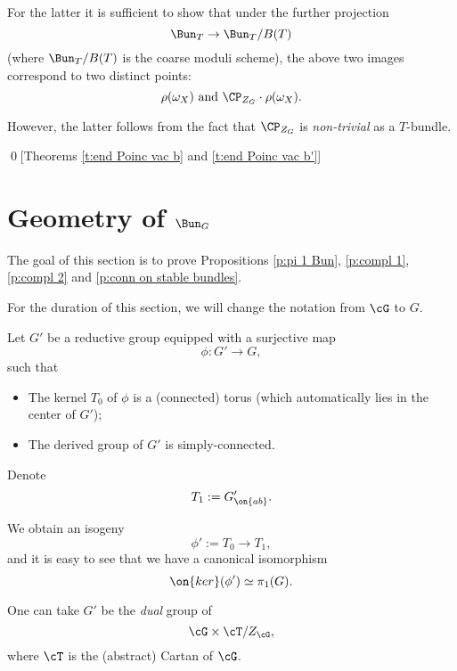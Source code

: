 \documentclass[9pt]{amsart}
\theoremstyle{remark}
\theoremstyle{definition}
\theoremstyle{remark}
\newcommand{\propref}[1]{Proposition~\ref{#1}}
\numberwithin{equation}{section}
\begin{document}
\sssec{}

For the latter it is sufficient to show that under the further projection
$$\Bun_T\to \Bun_T/B(T)$$
(where $\Bun_T/B(T)$ is the coarse moduli scheme), the above two images
correspond to two distinct points:
$$\rho(\omega_X) \text{ and } \CP_{Z_G}\cdot \rho(\omega_X).$$

\sssec{}

However, the latter follows from the fact that $\CP_{Z_G}$ is \emph{non-trivial} as a $T$-bundle. 

\qed[Theorems \ref{t:end Poinc vac b} and \ref{t:end Poinc vac b'}]

\section{Geometry of \texorpdfstring{$\Bun_G$}{geomBunG}} \label{s:LS}

The goal of this section is to prove Propositions \ref{p:pi 1 Bun}, \ref{p:compl 1}, \ref{p:compl 2} and \ref{p:conn on stable bundles}. 

\medskip

For the duration of this section, we will change the notation from $\cG$ to $G$. 

\ssec{Proof of \propref{p:pi 1 Bun}} \label{ss:calc pi 1 Bun}

\sssec{}

Let $G'$ be a reductive group equipped with a surjective map 
$$\phi:G'\to G,$$
such that

\begin{itemize}

\item The kernel $T_0$ of $\phi$ is a (connected) torus (which automatically lies in the center of $G'$);

\item The derived group of $G'$ is simply-connected.

\end{itemize}

\sssec{}

Denote
$$T_1:=G'_{\on{ab}}.$$

We obtain an isogeny 
$$\phi':=T_0\to T_1,$$
and it is easy to see that we have a canonical isomorphism
\begin{equation} \label{e:pi 1 via tori}
\on{ker}(\phi')\simeq \pi_1(G).
\end{equation} 


One can take $G'$ be the \emph{dual} group of
$$\cG\times \cT/Z_\cG,$$
where $\cT$ is the (abstract) Cartan of $\cG$.
\end{document}
